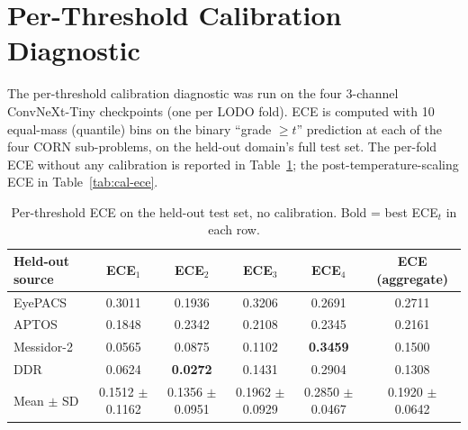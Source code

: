 \documentclass[11pt]{article}
\begin{document}
\section{Per-Threshold Calibration Diagnostic}

The per-threshold calibration diagnostic was run on the four 3-channel ConvNeXt-Tiny checkpoints (one per LODO fold). ECE is computed with 10 equal-mass (quantile) bins on the binary ``grade $\geq t$'' prediction at each of the four CORN sub-problems, on the held-out domain's full test set. The per-fold ECE without any calibration is reported in Table~\ref{tab:raw-ece}; the post-temperature-scaling ECE in Table~\ref{tab:cal-ece}.

\begin{table}[ht]
\centering
\begin{tabular}{lccccc}
\toprule
Held-out source & ECE$_1$ & ECE$_2$ & ECE$_3$ & ECE$_4$ & ECE (aggregate) \\
\midrule
EyePACS    & 0.3011 & 0.1936 & 0.3206 & 0.2691 & 0.2711 \\
APTOS      & 0.1848 & 0.2342 & 0.2108 & 0.2345 & 0.2161 \\
Messidor-2 & 0.0565 & 0.0875 & 0.1102 & \textbf{0.3459} & 0.1500 \\
DDR        & 0.0624 & \textbf{0.0272} & 0.1431 & 0.2904 & 0.1308 \\
\midrule
Mean $\pm$ SD & 0.1512 $\pm$ 0.1162 & 0.1356 $\pm$ 0.0951 & 0.1962 $\pm$ 0.0929 & 0.2850 $\pm$ 0.0467 & 0.1920 $\pm$ 0.0642 \\
\bottomrule
\end{tabular}
\caption{Per-threshold ECE on the held-out test set, no calibration. Bold = best ECE$_t$ in each row.}
\label{tab:raw-ece}
\end{table}
\end{document}
